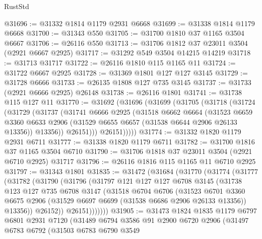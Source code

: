 \begin{lexlean}{RustStd}
\begin{coremodule}
@31696 := @31332 @1814 @1179 @2931 @6668
@31699 := @31338 @1814 @1179 @6668
@31700 := @31343 @550
@31705 := @31700 @1810 @37 @1165 @3504 @6667
@31706 := @26116 @550
@31713 := @31706 @1812 @37 @23011 @3504 (@2921 @6667 @2925)
@31717 := @31292 @549 @3504 @14215 @14219
@31718 := @31713 @31717
@31722 := @26116 @1810 @115 @1165 @11
@31724 := @31722 @6667 @2925
@31728 := @31369 @1801 @127 @127 @3145
@31729 := @31728 @6666
@31733 := @26135 @1808 @127 @735 @3145
@31737 := @31733 (@2921 @6666 @2925) @26148
@31738 := @26116 @1801
@31741 := @31738 @115 @127 @11
@31770 := @31692
    (@31696
      (@31699
        (@31705
          (@31718
            (@31724
              (@31729
                (@31737
                  (@31741
                    @6666
                    @2925
                    (@31518
                      @6662
                      @6664
                      (@31523
                        @6659
                        @3360
                        @6633
                        @2906
                        (@31529 @6655 @6657 (@31538 @6644 @2906 @26133 @13356))
                        @13356))
                    @26151)))
              @26151)))))
@31774 := @31332 @1820 @1179 @2931 @6711
@31777 := @31338 @1820 @1179 @6711
@31782 := @31700 @1816 @37 @1165 @3504 @6710
@31790 := @31706 @1818 @37 @23011 @3504 (@2921 @6710 @2925) @31717
@31796 := @26116 @1816 @115 @1165 @11 @6710 @2925
@31797 := @31343 @1801
@31835 := @31472
    (@31684
      (@31770
        (@31774
          (@31777
            (@31782
              (@31790
                (@31796
                  (@31797
                    @121
                    @127
                    @127
                    @6708
                    @3145
                    (@31738
                      @123
                      @127
                      @735
                      @6708
                      @3147
                      (@31518
                        @6704
                        @6706
                        (@31523
                          @6701
                          @3360
                          @6675
                          @2906
                          (@31529 @6697 @6699 (@31538 @6686 @2906 @26133 @13356))
                          @13356))
                      @26152))
                  @26151)))))))
@31905 := @31473
    @1824
    @1835
    @1179
    @6797
    @6801
    @2931
    @7120
    (@31489
      @6794
      @3586
      @91
      @2900
      @6720
      @2906
      (@31497
        @6783
        @6792
        (@31503
          @6783
          @6790
          @3549

\end{coremodule}
\end{lexlean}
